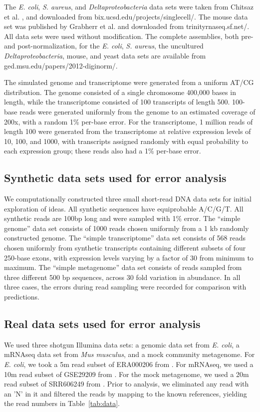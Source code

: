 The {\em E. coli}, {\em S. aureus}, and {\em Deltaproteobacteria} data sets
were taken from Chitsaz et al. \cite{pubmed21926975}, and downloaded from
bix.ucsd.edu/projects/singlecell/.  The mouse data set was published by
Grabherr et al. \cite{pubmed21572440} and downloaded from
trinityrnaseq.sf.net/.  All data sets were used without modification. The
complete assemblies, both pre- and post-normalization, for the {\em E. coli},
{\em S. aureus}, the uncultured {\em Deltaproteobacteria}, mouse, and yeast
data sets are available from ged.msu.edu/papers/2012-diginorm/.

The simulated genome and transcriptome were generated from a uniform AT/CG
distribution.  The genome consisted of a single chromosome 400,000 bases in
length, while the transcriptome consisted of 100 transcripts of length 500.
100-base reads were generated uniformly from the genome to an estimated
coverage of 200x, with a random 1\% per-base error.  For the transcriptome, 1
million reads of length 100 were generated from the transcriptome at relative
expression levels of 10, 100, and 1000, with transcripts assigned randomly with
equal probability to each expression group; these reads also had a 1\% per-base
error.


\subsection{Synthetic data sets used for error analysis}

We computationally constructed three small short-read DNA data sets for initial
exploration of ideas.  All synthetic sequences have equiprobable A/C/G/T.  All
synthetic reads are 100bp long and were sampled with 1\% error.  The ``simple
genome'' data set consists of 1000 reads chosen uniformly from a 1 kb randomly
constructed genome. The ``simple transcriptome'' data set consists of 568 reads
chosen uniformly from synthetic transcripts containing different subsets of
four 250-base exons, with expression levels varying by a factor of 30 from
minimum to maximum.  The ``simple metagenome'' data set consists of reads
sampled from three different 500 bp sequences, across 30 fold variation in
abundance.  In all three cases, the errors during read sampling were recorded
for comparison with predictions.

\subsection{Real data sets used for error analysis}

We used three shotgun Illumina data sets: a genomic data set from {\em E.
coli}, a mRNAseq data set from {\em Mus musculus}, and a mock community
metagenome.  For {\em E. coli}, we took a 5m read subset of ERA000206 from
\cite{chitsaz}.  For mRNAseq, we used a 10m read subset of GSE29209 from
\cite{trinityrna}.  For the mock metagenome, we used a 20m read subset of
SRR606249 from \cite{podar}.  Prior to analysis, we eliminated any read with an
'N' in it and filtered the reads by mapping to the known references, yielding
the read numbers in Table~\ref{tab:data}.

